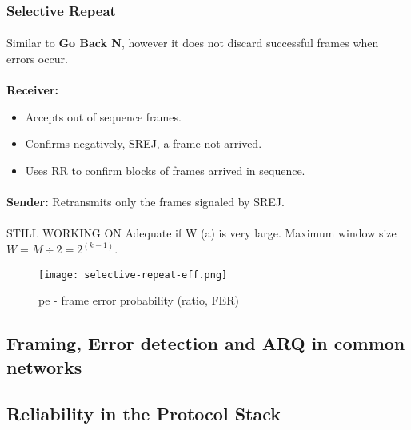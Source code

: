 \documentclass[../resumosRCOM.tex]{subfiles}
\begin{document}
\subsubsection{Selective Repeat}
\paragraph{}
Similar to \textbf{Go Back N}, however it does not discard successful frames when errors
occur.

\paragraph{}
\textbf{Receiver:}
\begin{itemize}
    \item Accepts out of sequence frames.
    \item Confirms negatively, SREJ, a frame not arrived.
    \item Uses RR to confirm blocks of frames arrived in sequence.    
\end{itemize}

\paragraph{}
\textbf{Sender:} Retransmits only the frames signaled by SREJ.

\paragraph{}
STILL WORKING ON \newline
Adequate if W (a) is very large. \newline
Maximum window size $W = M \div 2 = 2^(k-1)$.

\begin{figure}[H]
    \centering
    \texttt{[image: selective-repeat-eff.png]}
    \caption{pe - frame error probability (ratio, FER)}
\end{figure}

\subsection{Framing, Error detection and ARQ in common networks}
\subsection{Reliability in the Protocol Stack}
\end{document}
